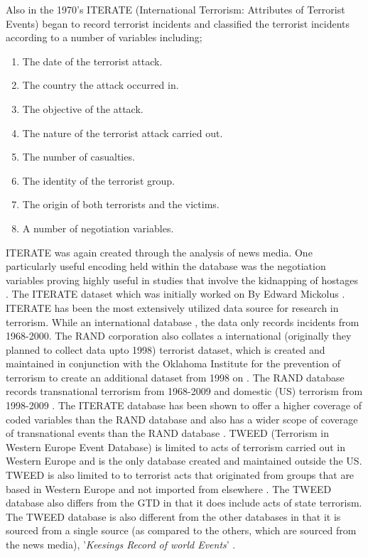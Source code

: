 Also in the 1970's ITERATE (International Terrorism: Attributes of Terrorist Events) began to record terrorist incidents and classified the terrorist incidents according to a number of variables including;  
\begin{enumerate}
\item The date of the terrorist attack.
\item The country the attack occurred in.
\item The objective of the attack.
\item The nature of the terrorist attack carried out.
\item The number of casualties.
\item The identity of the terrorist group.
\item The origin of both terrorists and the victims.
\item A number of negotiation variables.
\end{enumerate}
ITERATE was again created through the analysis of news media. One particularly useful encoding held within the database was the negotiation variables proving highly useful in studies that involve the kidnapping of hostages \citep{GPOL:GPOL142}. The ITERATE  dataset which was initially worked on By Edward Mickolus \citep{mickolus2013iterate}. ITERATE has been the most extensively utilized data source for research in terrorism. While an international database , the data only records incidents from  1968-2000. The RAND corporation also collates a international (originally they planned to collect data upto 1998) terrorist dataset, which is created and maintained in conjunction with the Oklahoma Institute for the prevention of terrorism to create an additional dataset from 1998 on \citep{lafree2007introducing}.  The RAND database records transnational terrorism from 1968-2009 and domestic (US) terrorism from 1998-2009 \citep{sandler2013analytical}. The ITERATE database has been shown to offer a higher coverage of coded variables than the RAND database and also has a wider scope of coverage of transnational events than the RAND database \citep{enders2011political}. TWEED (Terrorism in Western Europe Event Database) is limited to acts of terrorism carried out in Western Europe and is the only database created and maintained outside the US. TWEED is also limited to to terrorist acts that originated from groups that are based in Western Europe and not imported from elsewhere \citep{engene2007five}. The TWEED database also differs from the GTD in that it does include acts of state terrorism. The TWEED database is also different from the other databases in that it is sourced from a single source (as compared to the others, which are sourced from the news media), '\textit{Keesings Record of world Events}' \citep{east2016keesing}.

